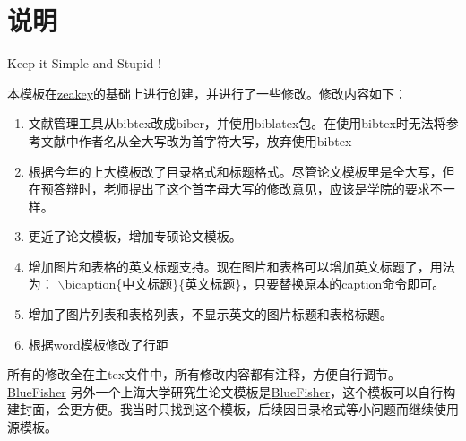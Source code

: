 \section{说明}

Keep it Simple and Stupid !

本模板在\href{https://github.com/zeakey/shu-thesis}{zeakey}的基础上进行创建，并进行了一些修改。修改内容如下：
\begin{enumerate}
	\item 文献管理工具从bibtex改成biber，并使用biblatex包。在使用bibtex时无法将参考文献中作者名从全大写改为首字符大写，放弃使用bibtex
	
	\item 根据今年的上大模板改了目录格式和标题格式。尽管论文模板里是全大写，但在预答辩时，老师提出了这个首字母大写的修改意见，应该是学院的要求不一样。
	
	\item 更近了论文模板，增加专硕论文模板。
	
	\item 增加图片和表格的英文标题支持。现在图片和表格可以增加英文标题了，用法为： $\backslash$bicaption\{中文标题\}\{英文标题\}，只要替换原本的caption命令即可。
	
	\item 增加了图片列表和表格列表，不显示英文的图片标题和表格标题。
	
	\item 根据word模板修改了行距
\end{enumerate}

所有的修改全在主tex文件中，所有修改内容都有注释，方便自行调节。
\href{https://github.com/BlueFisher/shuthesis}{BlueFisher}
另外一个上海大学研究生论文模板是\href{https://github.com/BlueFisher/shuthesis}{BlueFisher}，这个模板可以自行构建封面，会更方便。我当时只找到这个模板，后续因目录格式等小问题而继续使用源模板。




